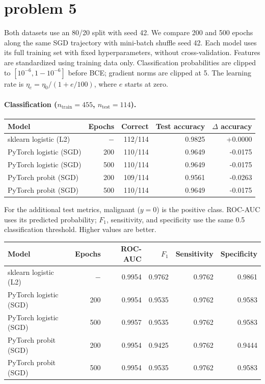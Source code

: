 \documentclass[11pt,a4paper]{article}
\begin{document}
\section{problem 5}
Both datasets use an 80/20 split with seed 42. We compare 200 and 500 epochs along the same SGD trajectory with mini-batch shuffle seed 42. Each model uses its full training set with fixed hyperparameters, without cross-validation. Features are standardized using training data only. Classification probabilities are clipped to $[10^{-6},1-10^{-6}]$ before BCE; gradient norms are clipped at 5. The learning rate is $\eta_e=\eta_0/(1+e/100)$, where $e$ starts at zero.

\paragraph{Classification ($n_{\mathrm{train}}=455$, $n_{\mathrm{test}}=114$).}
\begin{center}
  \begin{tabular}{lrrrr}
    \hline
    Model & Epochs & Correct & Test accuracy & $\Delta$ accuracy \\
    \hline
    sklearn logistic (L2) & $-$ & 112/114 & 0.9825 & +0.0000 \\
    PyTorch logistic (SGD) & 200 & 110/114 & 0.9649 & -0.0175 \\
    PyTorch logistic (SGD) & 500 & 110/114 & 0.9649 & -0.0175 \\
    PyTorch probit (SGD) & 200 & 109/114 & 0.9561 & -0.0263 \\
    PyTorch probit (SGD) & 500 & 110/114 & 0.9649 & -0.0175 \\
    \hline
  \end{tabular}
\end{center}

For the additional test metrics, malignant ($y=0$) is the positive class. ROC-AUC uses its predicted probability; $F_1$, sensitivity, and specificity use the same 0.5 classification threshold. Higher values are better.

\begin{center}
  \begin{tabular}{lrrrrr}
    \hline
    Model & Epochs & ROC-AUC & $F_1$ & Sensitivity & Specificity \\
    \hline
    sklearn logistic (L2) & $-$ & 0.9954 & 0.9762 & 0.9762 & 0.9861 \\
    PyTorch logistic (SGD) & 200 & 0.9954 & 0.9535 & 0.9762 & 0.9583 \\
    PyTorch logistic (SGD) & 500 & 0.9957 & 0.9535 & 0.9762 & 0.9583 \\
    PyTorch probit (SGD) & 200 & 0.9954 & 0.9425 & 0.9762 & 0.9444 \\
    PyTorch probit (SGD) & 500 & 0.9954 & 0.9535 & 0.9762 & 0.9583 \\
    \hline
  \end{tabular}
\end{center}
\end{document}
